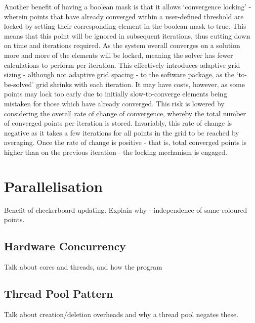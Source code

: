 			Another benefit of having a boolean mask is that it allows `convergence locking' - wherein points that have already converged within a user-defined threshold are locked by setting their corresponding element in the boolean mask to true. This means that this point will be ignored in subsequent iterations, thus cutting down on time and iterations required. As the system overall converges on a solution more and more of the elements will be locked, meaning the solver has fewer calculations to perform per iteration. This effectively introduces adaptive grid sizing - although not adaptive grid spacing - to the software package, as the `to-be-solved' grid shrinks with each iteration. It may have costs, however, as some points may lock too early due to initially slow-to-converge elements being mistaken for those which have already converged. This risk is lowered by considering the overall rate of change of convergence, whereby the total number of converged points per iteration is stored. Invariably, this rate of change is negative as it takes a few iterations for all points in the grid to be reached by averaging. Once the rate of change is positive - that is, total converged points is higher than on the previous iteration - the locking mechanism is engaged.
	
	\section{Parallelisation}
	
		Benefit of checkerboard updating. Explain why - independence of same-coloured points.
		
		\subsection{Hardware Concurrency}
		
			Talk about cores and threads, and how the program 
		
		\subsection{Thread Pool Pattern}
		
			Talk about creation/deletion overheads and why a thread pool negates these.
